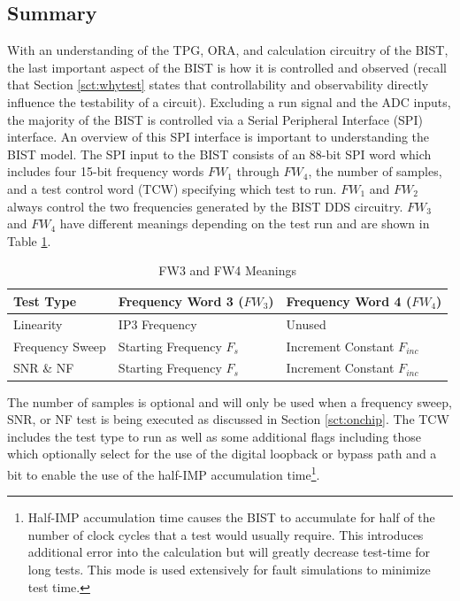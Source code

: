 \documentclass[12pt]{report}
\begin{document}
\subsection{Summary}
With an understanding of the TPG, ORA, and calculation circuitry of the BIST, the last important aspect of the BIST is how it is controlled and observed (recall that Section \ref{sct:whytest} states that controllability and observability directly influence the testability of a circuit).  Excluding a run signal and the ADC inputs, the majority of the BIST is controlled via a Serial Peripheral Interface (SPI) interface.  An overview of this SPI interface is important to understanding the BIST model.  The SPI input to the BIST consists of an 88-bit SPI word which includes four 15-bit frequency words $FW_1$ through $FW_4$, the number of samples, and a test control word (TCW) specifying which test to run.  $FW_1$ and $FW_2$ always control the two frequencies generated by the BIST DDS circuitry.  $FW_3$ and $FW_4$ have different meanings depending on the test run and are shown in Table \ref{tbl:fw34}.  
\begin{table}
  \caption{FW3 and FW4 Meanings}
  \begin{center}
    \begin{tabular}{|l|l|l|}
      \hline
      Test Type & Frequency Word 3 ($FW_3$) & Frequency Word 4 ($FW_4$) \\ \hline
      Linearity & IP3 Frequency & Unused \\ \hline
      Frequency Sweep & Starting Frequency $F_s$ & Increment Constant $F_{inc}$ \\ \hline
      SNR \& NF & Starting Frequency $F_s$ & Increment Constant $F_{inc}$ \\ \hline
    \end{tabular}
  \end{center}
  \label{tbl:fw34}
\end{table}
The number of samples is optional and will only be used when a frequency sweep, SNR, or NF test is being executed as discussed in Section \ref{sct:onchip}.  The TCW includes the test type to run as well as some additional flags including those which optionally select  for the use of the digital loopback or bypass path and a bit to enable the use of the half-IMP accumulation time\footnote{Half-IMP accumulation time causes the BIST to accumulate for half of the number of clock cycles that a test would usually require.  This introduces additional error into the calculation but will greatly decrease test-time for long tests\cite{jie-journal}.  This mode is used extensively for fault simulations to minimize test time.}.  
\end{document}
